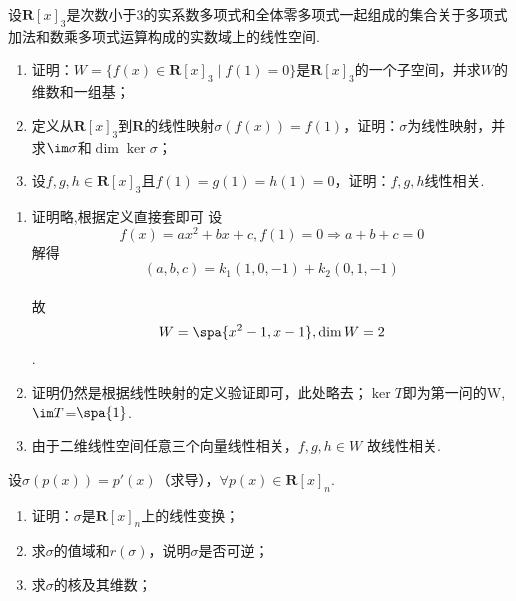 \begin{exercise}
\begin{exgroup}
\begin{answer}
        \end{answer}

        \item 设$\mathbf{R}[x]_3$是次数小于3的实系数多项式和全体零多项式一起组成的集合关于多项式加法和数乘多项式运算构成的实数域上的线性空间.
        \begin{enumerate}
            \item 证明：$W=\{f(x)\in \mathbf{R}[x]_3 \mid f(1)=0\}$是$\mathbf{R}[x]_3$的一个子空间，并求$W$的维数和一组基；

            \item 定义从$\mathbf{R}[x]_3$到$\mathbf{R}$的线性映射$\sigma(f(x))=f(1)$，证明：$\sigma$为线性映射，并求$\im\sigma$和$\dim\ker\sigma$；

            \item 设$f,g,h \in \mathbf{R}[x]_3$且$f(1)=g(1)=h(1)=0$，证明：$f,g,h$线性相关.
        \end{enumerate}
        \begin{answer}
        \begin{enumerate}
        \item 证明略,根据定义直接套即可
        设$$f(x)=ax^2+bx+c,f(1)=0\Rightarrow a+b+c=0$$解得$$(a,b,c)=k_1(1,0,-1)+k_2(0,1,-1)$$\\
        故$$W=\spa \{x^2-1,x-1\},\dim W=2$$.
        \item 证明仍然是根据线性映射的定义验证即可，此处略去；$\ker T$即为第一问的W,$\im T$=$\spa\{1\}$.
        \item 由于二维线性空间任意三个向量线性相关，$f,g,h \in W$ 故线性相关.
        \end{enumerate}
        \end{answer}

        \item 设$\sigma(p(x))=p'(x)$（求导），$\forall p(x) \in \mathbf{R}[x]_n$.
        \begin{enumerate}
            \item 证明：$\sigma$是$\mathbf{R}[x]_n$上的线性变换；

            \item 求$\sigma$的值域和$r(\sigma)$，说明$\sigma$是否可逆；

            \item 求$\sigma$的核及其维数；


\end{enumerate}
\end{exgroup}
\end{exercise}
